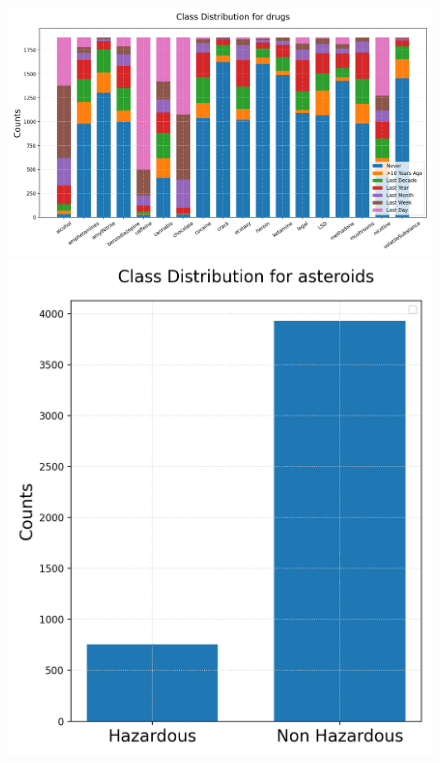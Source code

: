 \documentclass{article}
\begin{document}
\begin{figure}[h!]
	\centering
	\begin{minipage}[b]{0.99\textwidth}
		\includegraphics[width=\textwidth]{Plots/Inbalance_drugs.png}
	\end{minipage}
	\begin{minipage}[b]{0.32\textwidth}
	\includegraphics[width=\textwidth]{Plots/Inbalance_asteroids.png}
	\end{minipage}

\end{figure}
\end{document}
